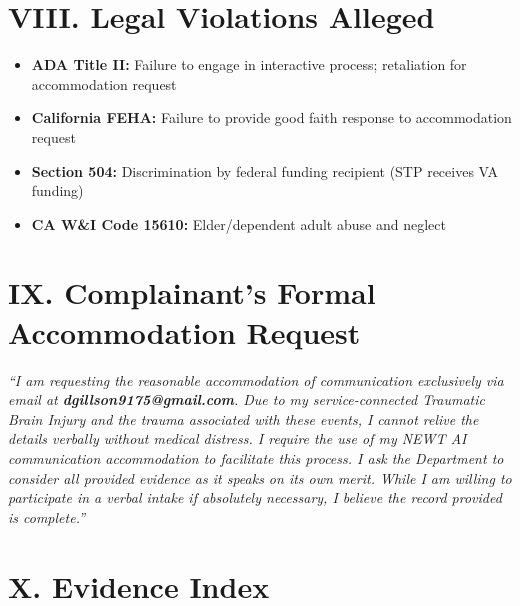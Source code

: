 \documentclass[11pt, a4paper]{article}
\begin{document}
\vspace{0.5cm}

\section{VIII. Legal Violations Alleged}

\begin{itemize}
    \item \textbf{ADA Title II:} Failure to engage in interactive process; retaliation for accommodation request
    \item \textbf{California FEHA:} Failure to provide good faith response to accommodation request
    \item \textbf{Section 504:} Discrimination by federal funding recipient (STP receives VA funding)
    \item \textbf{CA W\&I Code 15610:} Elder/dependent adult abuse and neglect
\end{itemize}

\vspace{0.5cm}

\section{IX. Complainant's Formal Accommodation Request}

\begin{tcolorbox}[colback=white, colframe=black!50, arc=0mm]
    \textit{``I am requesting the reasonable accommodation of communication exclusively via email at \textbf{dgillson9175@gmail.com}. Due to my service-connected Traumatic Brain Injury and the trauma associated with these events, I cannot relive the details verbally without medical distress. I require the use of my NEWT AI communication accommodation to facilitate this process. I ask the Department to consider all provided evidence as it speaks on its own merit. While I am willing to participate in a verbal intake if absolutely necessary, I believe the record provided is complete.''}
\end{tcolorbox}

\vspace{0.5cm}

\section{X. Evidence Index}
\end{document}
